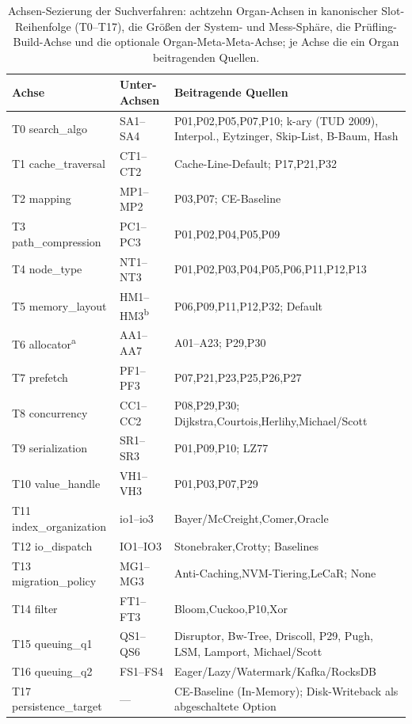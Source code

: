\begin{nurlang}
\begin{table}[!htbp]
  \caption{Achsen-Sezierung der Suchverfahren: achtzehn Organ-Achsen in kanonischer
  Slot-Reihenfolge (T0--T17), die Größen der System- und Mess-Sphäre, die
  Prüfling-Build-Achse und die optionale Organ-Meta-Meta-Achse; je Achse die ein Organ beitragenden Quellen.}\label{tab:axes-overview}
  \centering\footnotesize
  \begin{tabular}{@{}l l p{6.8cm}@{}}
    \toprule
    \textbf{Achse} & \textbf{Unter-Achsen} & \textbf{Beitragende Quellen} \\
    \midrule
    T0 search\_algo & SA1--SA4 & P01,P02,P05,P07,P10; k-ary (TUD 2009), Interpol., Eytzinger, Skip-List, B-Baum, Hash \\
    T1 cache\_traversal & CT1--CT2 & Cache-Line-Default; P17,P21,P32 \\
    T2 mapping & MP1--MP2 & P03,P07; CE-Baseline \\
    T3 path\_compression & PC1--PC3 & P01,P02,P04,P05,P09 \\
    T4 node\_type & NT1--NT3 & P01,P02,P03,P04,P05,P06,P11,P12,P13 \\
    T5 memory\_layout & HM1--HM3\textsuperscript{b} & P06,P09,P11,P12,P32; Default \\
    T6 allocator\textsuperscript{a} & AA1--AA7 & A01--A23; P29,P30 \\
    T7 prefetch & PF1--PF3 & P07,P21,P23,P25,P26,P27 \\
    T8 concurrency & CC1--CC2 & P08,P29,P30; Dijkstra,Courtois,Herlihy,Michael/Scott \\
    T9 serialization & SR1--SR3 & P01,P09,P10; LZ77 \\
    \midrule
    T10 value\_handle & VH1--VH3 & P01,P03,P07,P29 \\
    T11 index\_organization & io1--io3 & Bayer/McCreight,Comer,Oracle \\
    T12 io\_dispatch & IO1--IO3 & Stonebraker,Crotty; Baselines \\
    T13 migration\_policy & MG1--MG3 & Anti-Caching,NVM-Tiering,LeCaR\@; None \\
    T14 filter & FT1--FT3 & Bloom,Cuckoo,P10,Xor \\
    T15 queuing\_q1 & QS1--QS6 & Disruptor, Bw-Tree, Driscoll, P29, Pugh, LSM, Lamport, Michael/Scott \\
    T16 queuing\_q2 & FS1--FS4 & Eager/Lazy/Watermark/Kafka/RocksDB \\
    T17 persistence\_target & --- & CE-Baseline (In-Memory); Disk-Writeback als abgeschaltete Option \\

\end{tabular}
\end{table}
\end{nurlang}
